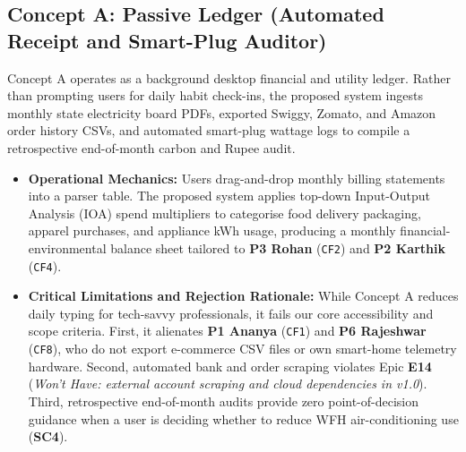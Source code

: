 \documentclass[12pt, a4paper]{article}
\begin{document}
\subsection{Concept A: Passive Ledger (Automated Receipt and Smart-Plug Auditor)}
Concept A operates as a background desktop financial and utility ledger. Rather than prompting users for daily habit check-ins, the proposed system ingests monthly state electricity board PDFs, exported Swiggy, Zomato, and Amazon order history CSVs, and automated smart-plug wattage logs to compile a retrospective end-of-month carbon and Rupee audit.
\begin{itemize}
    \item \textbf{Operational Mechanics:} Users drag-and-drop monthly billing statements into a parser table. The proposed system applies top-down Input-Output Analysis (IOA) spend multipliers to categorise food delivery packaging, apparel purchases, and appliance kWh usage, producing a monthly financial-environmental balance sheet tailored to \textbf{P3 Rohan} (\texttt{CF2}) and \textbf{P2 Karthik} (\texttt{CF4}).
    \item \textbf{Critical Limitations and Rejection Rationale:} While Concept A reduces daily typing for tech-savvy professionals, it fails our core accessibility and scope criteria. First, it alienates \textbf{P1 Ananya} (\texttt{CF1}) and \textbf{P6 Rajeshwar} (\texttt{CF8}), who do not export e-commerce CSV files or own smart-home telemetry hardware. Second, automated bank and order scraping violates Epic \textbf{E14} (\textit{Won't Have: external account scraping and cloud dependencies in v1.0}). Third, retrospective end-of-month audits provide zero point-of-decision guidance when a user is deciding whether to reduce WFH air-conditioning use (\textbf{SC4}).
\end{itemize}
\end{document}
